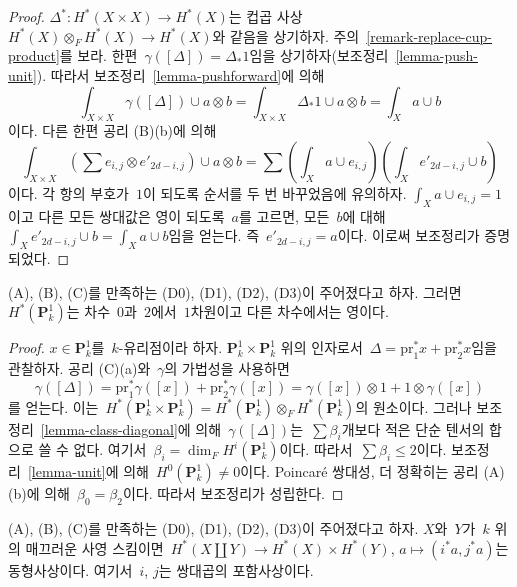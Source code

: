 \begin{proof}
$\Delta^* : H^*(X \times X) \to H^*(X)$는 컵곱 사상\ 
$H^*(X) \otimes_F H^*(X) \to H^*(X)$와 같음을 상기하자. 주의\ 
\ref{remark-replace-cup-product}를 보라. 한편\ 
$\gamma([\Delta]) = \Delta_*1$임을 상기하자(보조정리\ 
\ref{lemma-push-unit}). 따라서 보조정리\  \ref{lemma-pushforward}에 의해
$$
\int_{X \times X} \gamma([\Delta]) \cup a \otimes b =
\int_{X \times X} \Delta_*1 \cup a \otimes b =
\int_X a \cup b
$$
이다. 다른 한편 공리 (B)(b)에 의해
$$
\int_{X \times X} (\sum e_{i, j} \otimes e'_{2d -i , j}) \cup a \otimes b =
\sum (\int_X a \cup e_{i, j})(\int_X e'_{2d - i, j} \cup b)
$$
이다. 각 항의 부호가\  $1$이 되도록 순서를 두 번 바꾸었음에 유의하자.
$\int_X a \cup e_{i, j} = 1$이고 다른 모든 쌍대값은 영이 되도록\ 
$a$를 고르면, 모든\  $b$에 대해\ 
$\int_X e'_{2d - i, j} \cup b = \int_X a \cup b$임을 얻는다.
즉\  $e'_{2d - i, j} = a$이다. 이로써 보조정리가 증명되었다.
\end{proof}

\begin{lemma}
\label{lemma-cohomology-P1}
(A), (B), (C)를 만족하는 (D0), (D1), (D2), (D3)이 주어졌다고 하자.
그러면\  $H^*(\mathbf{P}^1_k)$는 차수\  $0$과\  $2$에서\  $1$차원이고 다른
차수에서는 영이다.
\end{lemma}

\begin{proof}
$x \in \mathbf{P}^1_k$를\  $k$-유리점이라 하자.
$\mathbf{P}^1_k \times \mathbf{P}^1_k$ 위의 인자로서\ 
$\Delta = \text{pr}_1^*x + \text{pr}_2^*x$임을 관찰하자.
공리 (C)(a)와\  $\gamma$의 가법성을 사용하면
$$
\gamma([\Delta]) =
\text{pr}_1^*\gamma([x]) +
\text{pr}_2^*\gamma([x]) =
\gamma([x]) \otimes 1 + 1 \otimes \gamma([x])
$$
를 얻는다. 이는\ 
$H^*(\mathbf{P}^1_k \times \mathbf{P}^1_k) =
H^*(\mathbf{P}^1_k) \otimes_F H^*(\mathbf{P}^1_k)$의 원소이다.
그러나 보조정리\  \ref{lemma-class-diagonal}에 의해\ 
$\gamma([\Delta])$는\  $\sum \beta_i$개보다 적은 단순 텐서의 합으로
쓸 수 없다. 여기서\  $\beta_i = \dim_F H^i(\mathbf{P}^1_k)$이다.
따라서\  $\sum \beta_i \leq 2$이다. 보조정리\  \ref{lemma-unit}에 의해\ 
$H^0(\mathbf{P}^1_k) \not = 0$이다. Poincar\'e 쌍대성, 더 정확히는
공리 (A)(b)에 의해\  $\beta_0 = \beta_2$이다. 따라서 보조정리가 성립한다.
\end{proof}

\begin{lemma}
\label{lemma-weil-additive}
(A), (B), (C)를 만족하는 (D0), (D1), (D2), (D3)이 주어졌다고 하자.
$X$와\  $Y$가\  $k$ 위의 매끄러운 사영 스킴이면\ 
$H^*(X \amalg Y) \to H^*(X) \times H^*(Y)$,
$a \mapsto (i^*a, j^*a)$는 동형사상이다. 여기서\  $i$, $j$는
쌍대곱의 포함사상이다.
\end{lemma}

